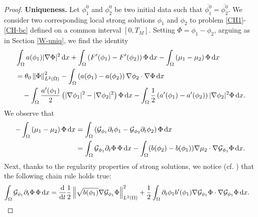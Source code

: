 \documentclass[11pt,reqno]{amsart}
\theoremstyle{remark}
\newcommand \norm[1] {\left\Vert #1\right\Vert}
\def\G{\mathcal{G}}
\def\d{{\rm d}}
\def\uu{\boldsymbol{u}}
\def\ddt{\frac{\d}{\d t}}
\numberwithin{equation}{section}
\def\d{{\rm d}}
\begin{document}
\begin{proof}
\textbf{Uniqueness.} Let $\phi_{1}^0$ and $\phi_2^0$ be two initial data such that $\overline{\phi_{1}^0}=\overline{\phi_{2}^0}$. We consider two corresponding local strong solutions $\phi_1$ and $\phi_2$  to problem \eqref{CH1}-\eqref{CH-bc} defined on a common interval $[0,T_M]$.
Setting $\Phi=\phi_1-\phi_2$, arguing as in Section \ref{W-uniq}, we find the identity
 \begin{align*}
& \int_\Omega a(\phi_1) |\nabla \Phi |^2 \, \d x
 +
  \int_\Omega \left( F'(\phi_1)-F'(\phi_2) \right)   \Phi \, \d x
- \int_{\Omega} \left( \mu_1-\mu_2\right)  \Phi \, \d x
\\
&=
 \theta_0 \norm{\Phi}_{L^2(\Omega)}^2
 - \int_\Omega \left( a(\phi_1)-a(\phi_2)\right) \nabla \phi_2 \cdot \nabla \Phi \, \d x
 \\
 &\quad -\int_\Omega \frac{a'(\phi_1)}{2}  \left( |\nabla \phi_1|^2-|\nabla \phi_2|^2\right) \Phi
 \, \d x
 - \int_\Omega \frac12  \left( a'(\phi_1)-a'(\phi_2)\right) | \nabla \phi_2|^2 \Phi \, \d x.
\end{align*}
We observe that
\begin{align*}
- \int_{\Omega} \left( \mu_1-\mu_2\right)  \Phi \, \d x
&=
 \int_\Omega \left( \G_{\phi_1}  \partial_t \phi_1 - \G_{\phi_2} \partial_t \phi_2  \right)  \Phi \, \d x
 \\
 &=
\int_\Omega  \G_{\phi_1} \partial_t \Phi  \, \Phi \, \d x
- \int_\Omega (b(\phi_2)-b(\phi_1)) \nabla \mu_2 \cdot \nabla \G_{\phi_1} \Phi \, \d x.
\end{align*}
Next, thanks to the regularity properties of strong solutions, we notice (cf. \cite[Eqn. (2.22)]{BB1999}) that the following chain rule holds true:
\begin{align}
\int_\Omega \G_{\phi_1} \partial_t \Phi \,  \Phi \, \d x
&= \ddt \frac{1}{2} \norm{\sqrt{b(\phi_1)}\nabla \G_{\phi_1} \Phi}_{L^2(\Omega)}^2
+\frac12 \int_\Omega \partial_t \phi_1 b'(\phi_1) \nabla \G_{\phi_1} \Phi \cdot \nabla \G_{\phi_1} \Phi\,\d x.
\notag
\end{align}

\end{proof}
\end{document}
